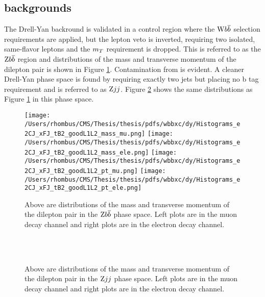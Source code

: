 \subsection{\zll backgrounds}

The Drell-Yan backround is validated in a control region where the $\mathrm{W} b\overline{b}$
 selection requirements are applied, but the lepton veto 
 is inverted, requiring two isolated, same-flavor leptons 
 and the $m_T$ requirement is dropped.
This is referred to as the $\mathrm{Z} b\overline{b}$ region and distributions
 of the mass and transverse momentum of the dilepton pair is
 shown in Figure \ref{fig:prefit_dybb}.
Contamination from \ttbar is evident. 
A cleaner Drell-Yan phase space is found by requiring exactly two jets
 but placing no b tag requirement and is referred to as $\mathrm{Z} jj$.
Figure \ref{fig:prefit_dyjj} shows the same distributions as
 Figure \ref{fig:prefit_dybb} in this phase space.

\begin{figure}
      \caption[\zbb control region for the \wbb analysis]{ Above are distributions of the mass and
        transverse momentum of the dilepton pair in the
        $\mathrm{Z} b\overline{b}$ phase space.
       Left plots are in the muon decay channel and right
        plots are in the electron decay channel.
      }
      \center
\texttt{[image: /Users/rhombus/CMS/Thesis/thesis/pdfs/wbbxc/dy/Histograms\_e2CJ\_xFJ\_tB2\_goodL1L2\_mass\_mu.png]}
\texttt{[image: /Users/rhombus/CMS/Thesis/thesis/pdfs/wbbxc/dy/Histograms\_e2CJ\_xFJ\_tB2\_goodL1L2\_mass\_ele.png]}
\texttt{[image: /Users/rhombus/CMS/Thesis/thesis/pdfs/wbbxc/dy/Histograms\_e2CJ\_xFJ\_tB2\_goodL1L2\_pt\_mu.png]}
\texttt{[image: /Users/rhombus/CMS/Thesis/thesis/pdfs/wbbxc/dy/Histograms\_e2CJ\_xFJ\_tB2\_goodL1L2\_pt\_ele.png]}
      \label{fig:prefit_dybb}
\end{figure}

\begin{figure}
      \caption[\zjj control region for the \wbb measurement]{ Above are distributions of the mass and
        transverse momentum of the dilepton pair in the
        $\mathrm{Z} jj$ phase space.
       Left plots are in the muon decay channel and right
        plots are in the electron decay channel.
      }
      \center
  \\
  \\
      \label{fig:prefit_dyjj}
\end{figure}


